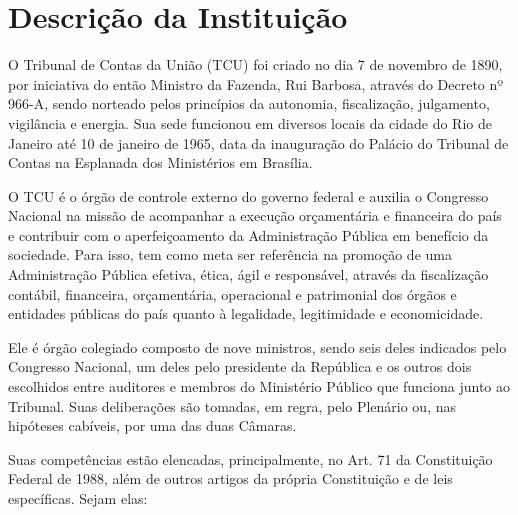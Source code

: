 \chapter[Descrição da Instituição]{Descrição da Instituição}


O Tribunal de Contas da União (TCU) foi criado no dia 7 de novembro de 1890, por iniciativa do então 
Ministro da Fazenda, Rui Barbosa, através do Decreto nº 966-A, sendo norteado pelos princípios da 
autonomia, fiscalização, julgamento, vigilância e energia. Sua sede funcionou em diversos locais da 
cidade do Rio de Janeiro até 10 de janeiro de 1965, data da inauguração do Palácio do Tribunal de 
Contas na Esplanada dos Ministérios em Brasília.

O TCU é o órgão de controle externo do governo federal e auxilia o Congresso Nacional na missão de 
acompanhar a execução orçamentária e financeira do país e contribuir com o aperfeiçoamento da 
Administração Pública em benefício da sociedade. Para isso, tem como meta ser referência na 
promoção de uma Administração Pública efetiva, ética, ágil e responsável, através da 
fiscalização contábil, financeira, orçamentária, operacional e patrimonial dos órgãos e 
entidades públicas do país quanto à legalidade, legitimidade e economicidade.

Ele é órgão colegiado composto de nove ministros, sendo seis deles indicados pelo Congresso 
Nacional, um deles pelo presidente da República e os outros dois escolhidos entre auditores e 
membros do Ministério Público que funciona junto ao Tribunal. Suas deliberações são tomadas, em regra, 
pelo Plenário ou, nas hipóteses cabíveis, por uma das duas Câmaras.

Suas competências estão elencadas, principalmente, no Art. 71 da Constituição Federal de 1988, além 
de outros artigos da própria Constituição e de leis específicas. Sejam elas:


